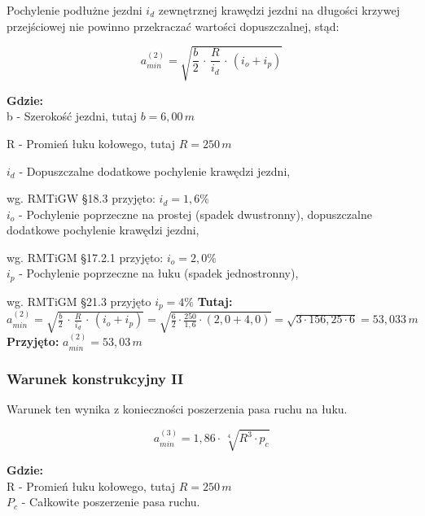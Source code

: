 \documentclass[12pt]{article}
\begin{document}
            Pochylenie podłużne jezdni $i_{d}$ zewnętrznej krawędzi jezdni na długości krzywej przejściowej nie powinno przekraczać wartości dopuszczalnej, stąd:
    		
    		\begin{equation}
    			a_{min}^{(2)}=\sqrt{\frac{b}{2}\,\cdot\,\frac{R}{i_{d}}\,\cdot\,(i_{o}+i_{p})}
            \end{equation} 
            
            \textbf{Gdzie:}\\
            b - Szerokość jezdni, tutaj \( b = 6,00\,m \)

            R - Promień łuku kołowego, tutaj \( R = 250 \,m\)

            $i_{d}$ - Dopuszczalne dodatkowe pochylenie krawędzi jezdni,

            \qquad wg. RMTiGW §18.3 przyjęto: \(i_{d}=1,6\%\)\\
            $i_{o}$ - Pochylenie poprzeczne na prostej (spadek dwustronny), dopuszczalne dodatkowe pochylenie krawędzi jezdni,
            
            \qquad wg. RMTiGM §17.2.1 przyjęto: \(i_{o}=2,0\%\) \\
            $i_{p}$ - Pochylenie poprzeczne na łuku (spadek jednostronny),
            
            \qquad wg. RMTiGM §21.3 przyjęto \(i_{p}=4\%\)
            \newline \newline
            \textbf{Tutaj:} \(
            a_{min}^{(2)}=\sqrt{\frac{b}{2}\,\cdot\,\frac{R}{i_{d}}\,\cdot\,(i_{o}+i_{p})}
            =\sqrt{\frac{6}{2}\cdot\frac{250}{1,6}\cdot(2,0+4,0)}
            =\sqrt{3\cdot156,25\cdot6}=53,033\,m\)
            \newline \newline \textbf{Przyjęto:} \( a_{min}^{(2)}=53,03\,m \)
            \newpage
        \subsubsection{Warunek konstrukcyjny II}
            Warunek ten wynika z konieczności poszerzenia pasa ruchu na łuku.

            \begin{equation}
                a_{min}^{(3)} = 1,86 \cdot\, \sqrt[4]{R^{3} \cdot p_{c}}
            \end{equation} 
            
            \textbf{Gdzie:}\\
            R - Promień łuku kołowego, tutaj \( R = 250 \,m\)\\
            $P_{c}$ - Całkowite poszerzenie pasa ruchu.
            
\end{document}
